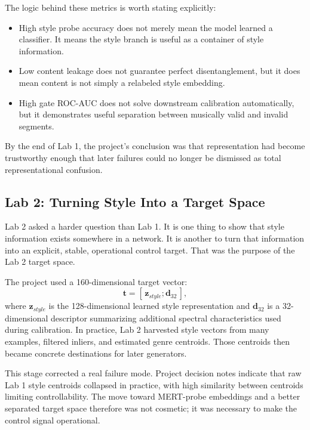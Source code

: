 \documentclass[conference]{IEEEtran}
\begin{document}
The logic behind these metrics is worth stating explicitly:
\begin{itemize}[leftmargin=1.5em]
    \item High style probe accuracy does not merely mean the model learned a classifier. It means the style branch is useful as a container of style information.
    \item Low content leakage does not guarantee perfect disentanglement, but it does mean content is not simply a relabeled style embedding.
    \item High gate ROC-AUC does not solve downstream calibration automatically, but it demonstrates useful separation between musically valid and invalid segments.
\end{itemize}

By the end of Lab 1, the project's conclusion was that representation had become trustworthy enough that later failures could no longer be dismissed as total representational confusion.

\subsection{Lab 2: Turning Style Into a Target Space}
Lab 2 asked a harder question than Lab 1. It is one thing to show that style information exists somewhere in a network. It is another to turn that information into an explicit, stable, operational control target. That was the purpose of the Lab 2 target space.

The project used a 160-dimensional target vector:
\begin{equation}
\mathbf{t} = [\,\mathbf{z}_{style}; \mathbf{d}_{32}\,],
\end{equation}
where $\mathbf{z}_{style}$ is the 128-dimensional learned style representation and $\mathbf{d}_{32}$ is a 32-dimensional descriptor summarizing additional spectral characteristics used during calibration. In practice, Lab 2 harvested style vectors from many examples, filtered inliers, and estimated genre centroids. Those centroids then became concrete destinations for later generators.

This stage corrected a real failure mode. Project decision notes indicate that raw Lab 1 style centroids collapsed in practice, with high similarity between centroids limiting controllability. The move toward MERT-probe embeddings and a better separated target space therefore was not cosmetic; it was necessary to make the control signal operational.
\end{document}
